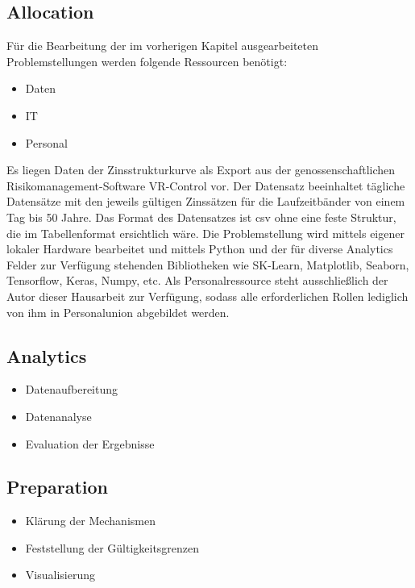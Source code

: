 \subsection{Allocation} \label{sec: p_Allocation}
Für die Bearbeitung der im vorherigen Kapitel ausgearbeiteten Problemstellungen werden folgende Ressourcen benötigt:
\begin{itemize}
    \item Daten
    \item IT
    \item Personal
\end{itemize}

Es liegen Daten der Zinsstrukturkurve als Export aus der genossenschaftlichen Risikomanagement-Software VR-Control
vor.
Der Datensatz beeinhaltet tägliche Datensätze mit den jeweils gültigen Zinssätzen für die Laufzeitbänder von einem Tag bis
50 Jahre.
Das Format des Datensatzes ist csv ohne eine feste Struktur, die im Tabellenformat ersichtlich wäre.
\newline
Die Problemstellung wird mittels eigener lokaler Hardware bearbeitet und mittels Python und der für diverse Analytics
Felder zur Verfügung stehenden Bibliotheken wie SK-Learn, Matplotlib, Seaborn, Tensorflow, Keras, Numpy, etc.
\newline
Als Personalressource steht ausschließlich der Autor dieser Hausarbeit zur Verfügung, sodass alle erforderlichen Rollen
lediglich von ihm in Personalunion abgebildet werden.

\subsection{Analytics} \label{sec: p_Analytics}
\begin{itemize}
    \item Datenaufbereitung
    \item Datenanalyse
    \item Evaluation der Ergebnisse
\end{itemize}

\subsection{Preparation} \label{sec: p_Preparation}
\begin{itemize}
    \item Klärung der Mechanismen
    \item Feststellung der Gültigkeitsgrenzen
    \item Visualisierung
\end{itemize}